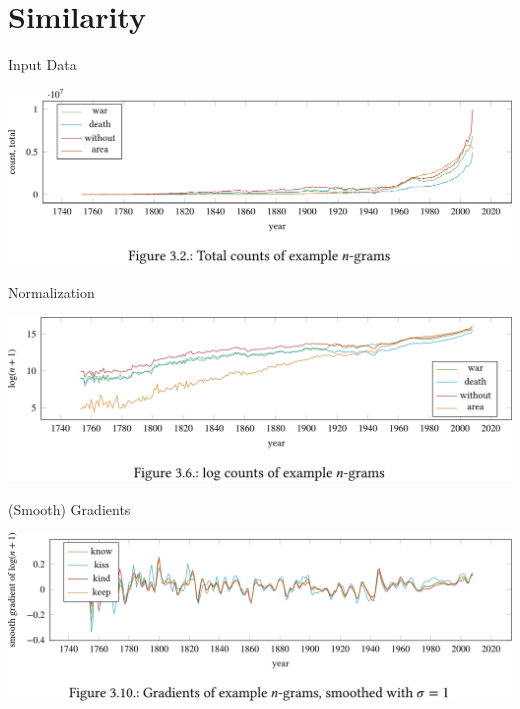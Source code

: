 \documentclass[14pt,t]{beamer}
\begin{document}
\section{Similarity}
\begin{frame}[c]{Input Data}
    \begin{center}
        \includegraphics[width = \textwidth]{img/example-noop}
    \end{center}
\end{frame}
\begin{frame}[c]{Normalization}
    \begin{center}
        \includegraphics[width = \textwidth]{img/example-log}
    \end{center}
\end{frame}
\begin{frame}[c]{(Smooth) Gradients}
    \begin{center}
        \includegraphics[width = \textwidth]{img/example-gradient-smooth}
    \end{center}
\end{frame}
\end{document}
